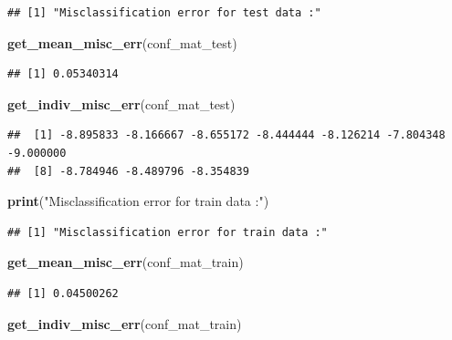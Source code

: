 \documentclass[
]{article}
\newenvironment{Shaded}{\begin{snugshade}}{\end{snugshade}}
\newcommand{\FunctionTok}[1]{\textcolor[rgb]{0.13,0.29,0.53}{\textbf{#1}}}
\newcommand{\NormalTok}[1]{#1}
\newcommand{\StringTok}[1]{\textcolor[rgb]{0.31,0.60,0.02}{#1}}
\begin{document}
\begin{verbatim}
## [1] "Misclassification error for test data :"
\end{verbatim}

\begin{Shaded}
\begin{Highlighting}[]
\FunctionTok{get\_mean\_misc\_err}\NormalTok{(conf\_mat\_test)}
\end{Highlighting}
\end{Shaded}

\begin{verbatim}
## [1] 0.05340314
\end{verbatim}

\begin{Shaded}
\begin{Highlighting}[]
\FunctionTok{get\_indiv\_misc\_err}\NormalTok{(conf\_mat\_test)}
\end{Highlighting}
\end{Shaded}

\begin{verbatim}
##  [1] -8.895833 -8.166667 -8.655172 -8.444444 -8.126214 -7.804348 -9.000000
##  [8] -8.784946 -8.489796 -8.354839
\end{verbatim}

\begin{Shaded}
\begin{Highlighting}[]
\FunctionTok{print}\NormalTok{(}\StringTok{"Misclassification error for train data :"}\NormalTok{)}
\end{Highlighting}
\end{Shaded}

\begin{verbatim}
## [1] "Misclassification error for train data :"
\end{verbatim}

\begin{Shaded}
\begin{Highlighting}[]
\FunctionTok{get\_mean\_misc\_err}\NormalTok{(conf\_mat\_train)}
\end{Highlighting}
\end{Shaded}

\begin{verbatim}
## [1] 0.04500262
\end{verbatim}

\begin{Shaded}
\begin{Highlighting}[]
\FunctionTok{get\_indiv\_misc\_err}\NormalTok{(conf\_mat\_train)}
\end{Highlighting}
\end{Shaded}
\end{document}
